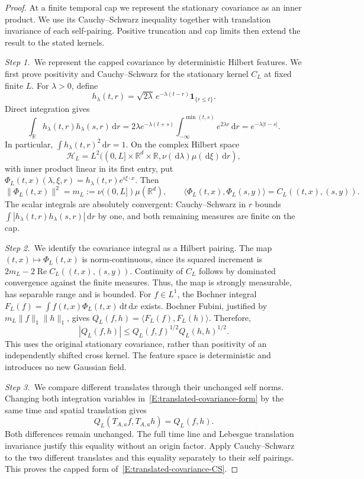 \documentclass[12pt,oneside,openany]{book}
\numberwithin{equation}{section}
\theoremstyle{nogostyle}
\theoremstyle{definition}
\newcommand{\R}{\mathbb{R}}
\newcommand{\ud}{\,\mathrm{d}}
\begin{document}
\begin{proof}
  At a finite temporal cap we represent the stationary covariance as an inner
  product. We use its Cauchy--Schwarz inequality together with translation
  invariance of each self-pairing. Positive truncation and cap limits then
  extend the result to the stated kernels.


  \medskip
  \noindent\textit{Step 1.~}We represent the capped covariance by
  deterministic Hilbert features.
  We first prove positivity and Cauchy--Schwarz for the stationary kernel $C_L$
  at fixed finite $L$. For $\lambda > 0$, define
  \[
    h_\lambda(t,r)=\sqrt{2\lambda}\,e^{-\lambda(t-r)}
    \mathbf1_{\{r\le t\}}.
  \]
  Direct integration gives
  \[
    \int_\R h_\lambda(t,r)h_\lambda(s,r)\ud r
    =2\lambda e^{-\lambda(t+s)}
    \int_{-\infty}^{\min(t,s)}e^{2\lambda r}\ud r
    =e^{-\lambda|t-s|}.
  \]
  In particular, $\int h_\lambda(t,r)^2\ud r = 1$. On the complex Hilbert space
  \[
    \mathcal{H}_L=L^2((0,L]\times\R^d\times\R,
    \nu(\ud\lambda)\mu(\ud\xi)\ud r),
  \]
  with inner product linear in its first entry, put $\Phi_L(t,x)(\lambda,\xi,r)
  = h_\lambda(t,r)e^{i\xi\cdot x}$. Then
  \[
    \|\Phi_L(t,x)\|^2=m_L:=\nu((0,L])\mu(\R^d),\qquad
    \langle\Phi_L(t,x),\Phi_L(s,y)\rangle=C_L((t,x),(s,y)).
  \]
  The scalar integrals are absolutely convergent: Cauchy--Schwarz in $r$ bounds
  $\int|h_\lambda(t,r)h_\lambda(s,r)|\ud r$ by one, and both remaining measures
  are finite on the cap.


  \medskip
  \noindent\textit{Step 2.~}We identify the covariance integral as a Hilbert
  pairing.
  The map $(t,x)\mapsto\Phi_L(t,x)$ is norm-continuous, since its squared
  increment is $2m_L-2\operatorname{Re}C_L((t,x),(s,y))$. Continuity of $C_L$
  follows by dominated convergence against the finite measures. Thus, the map is
  strongly measurable, has separable range and is bounded. For $f \in L^1$, the
  Bochner integral $F_L(f) = \int f(t,x)\Phi_L(t,x)\ud t\ud x$ exists. Bochner
  Fubini, justified by $m_L\|f\|_1\|h\|_1$, gives $Q_L(f,h) = \langle
  F_L(f),F_L(h)\rangle$. Therefore,
  \[
    |Q_L(f,h)|\le Q_L(f,f)^{1/2}Q_L(h,h)^{1/2}.
  \]
  This uses the original stationary covariance, rather than positivity of an
  independently shifted cross kernel. The feature space is deterministic and
  introduces no new Gaussian field.


  \medskip
  \noindent\textit{Step 3.~}We compare different translates through their
  unchanged self norms.
  Changing both integration variables in~\eqref{E:translated-covariance-form} by
  the same time and spatial translation gives
  \[
    Q_L(T_{A,a}f,T_{A,a}h)=Q_L(f,h).
  \]
  Both differences remain unchanged. The full time line and Lebesgue translation
  invariance justify this equality without an origin factor. Apply
  Cauchy--Schwarz to the two different translates and this equality separately
  to their self pairings. This proves the capped form
  of~\eqref{E:translated-covariance-CS}.



\end{proof}
\end{document}

